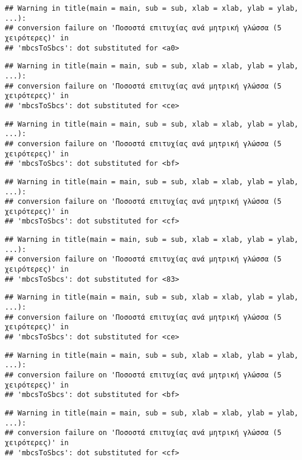 \documentclass[
]{article}
\begin{document}
\begin{verbatim}
## Warning in title(main = main, sub = sub, xlab = xlab, ylab = ylab, ...):
## conversion failure on 'Ποσοστά επιτυχίας ανά μητρική γλώσσα (5 χειρότερες)' in
## 'mbcsToSbcs': dot substituted for <a0>
\end{verbatim}

\begin{verbatim}
## Warning in title(main = main, sub = sub, xlab = xlab, ylab = ylab, ...):
## conversion failure on 'Ποσοστά επιτυχίας ανά μητρική γλώσσα (5 χειρότερες)' in
## 'mbcsToSbcs': dot substituted for <ce>
\end{verbatim}

\begin{verbatim}
## Warning in title(main = main, sub = sub, xlab = xlab, ylab = ylab, ...):
## conversion failure on 'Ποσοστά επιτυχίας ανά μητρική γλώσσα (5 χειρότερες)' in
## 'mbcsToSbcs': dot substituted for <bf>
\end{verbatim}

\begin{verbatim}
## Warning in title(main = main, sub = sub, xlab = xlab, ylab = ylab, ...):
## conversion failure on 'Ποσοστά επιτυχίας ανά μητρική γλώσσα (5 χειρότερες)' in
## 'mbcsToSbcs': dot substituted for <cf>
\end{verbatim}

\begin{verbatim}
## Warning in title(main = main, sub = sub, xlab = xlab, ylab = ylab, ...):
## conversion failure on 'Ποσοστά επιτυχίας ανά μητρική γλώσσα (5 χειρότερες)' in
## 'mbcsToSbcs': dot substituted for <83>
\end{verbatim}

\begin{verbatim}
## Warning in title(main = main, sub = sub, xlab = xlab, ylab = ylab, ...):
## conversion failure on 'Ποσοστά επιτυχίας ανά μητρική γλώσσα (5 χειρότερες)' in
## 'mbcsToSbcs': dot substituted for <ce>
\end{verbatim}

\begin{verbatim}
## Warning in title(main = main, sub = sub, xlab = xlab, ylab = ylab, ...):
## conversion failure on 'Ποσοστά επιτυχίας ανά μητρική γλώσσα (5 χειρότερες)' in
## 'mbcsToSbcs': dot substituted for <bf>
\end{verbatim}

\begin{verbatim}
## Warning in title(main = main, sub = sub, xlab = xlab, ylab = ylab, ...):
## conversion failure on 'Ποσοστά επιτυχίας ανά μητρική γλώσσα (5 χειρότερες)' in
## 'mbcsToSbcs': dot substituted for <cf>
\end{verbatim}
\end{document}
